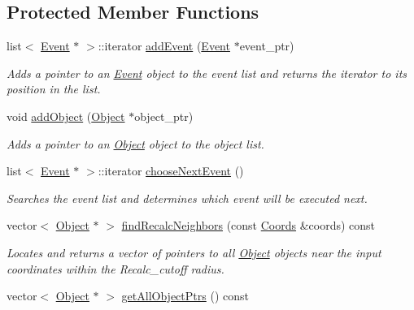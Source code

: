 \subsection*{Protected Member Functions}
\begin{DoxyCompactItemize}
\item 
list$<$ \hyperlink{class_event}{Event} $\ast$ $>$\+::iterator \hyperlink{class_simulation_a4b84249d359723e00ec4ae77164c8b7d}{add\+Event} (\hyperlink{class_event}{Event} $\ast$event\+\_\+ptr)
\begin{DoxyCompactList}\small\item\em Adds a pointer to an \hyperlink{class_event}{Event} object to the event list and returns the iterator to its position in the list. \end{DoxyCompactList}\item 
void \hyperlink{class_simulation_a1e0f43c4e11eda5486054c250f4de08f}{add\+Object} (\hyperlink{class_object}{Object} $\ast$object\+\_\+ptr)
\begin{DoxyCompactList}\small\item\em Adds a pointer to an \hyperlink{class_object}{Object} object to the object list. \end{DoxyCompactList}\item 
list$<$ \hyperlink{class_event}{Event} $\ast$ $>$\+::iterator \hyperlink{class_simulation_a401d40509ba367a28702873a0d65188d}{choose\+Next\+Event} ()
\begin{DoxyCompactList}\small\item\em Searches the event list and determines which event will be executed next. \end{DoxyCompactList}\item 
vector$<$ \hyperlink{class_object}{Object} $\ast$ $>$ \hyperlink{class_simulation_aa6501dc60b4a3981f6ca44cec861364a}{find\+Recalc\+Neighbors} (const \hyperlink{struct_coords}{Coords} \&coords) const
\begin{DoxyCompactList}\small\item\em Locates and returns a vector of pointers to all \hyperlink{class_object}{Object} objects near the input coordinates within the Recalc\+\_\+cutoff radius. \end{DoxyCompactList}\item 
\mbox{\label{class_simulation_a620684b9ac1fb07344c4c2237ed9f352}} 
vector$<$ \hyperlink{class_object}{Object} $\ast$ $>$ \hyperlink{class_simulation_a620684b9ac1fb07344c4c2237ed9f352}{get\+All\+Object\+Ptrs} () const

\end{DoxyCompactItemize}
